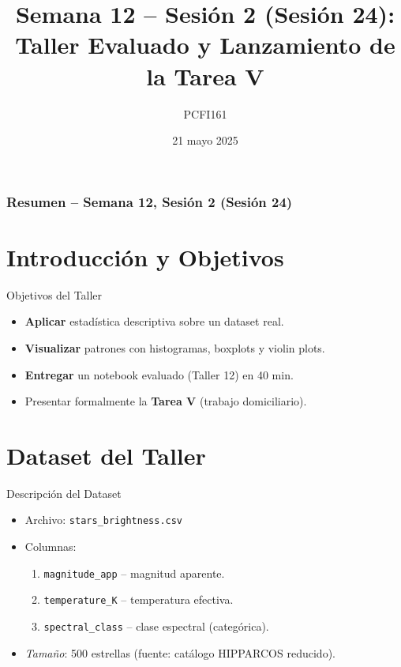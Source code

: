 \documentclass[10pt]{beamer}
\title{Semana 12 – Sesión 2 (Sesión 24): Taller Evaluado y Lanzamiento de la Tarea V}
\author{PCFI161}
\date{21 mayo 2025}
\begin{document}
\myfront{}
\begin{frame}
  \titlepage
\end{frame}

\begin{frame}
  \frametitle{Resumen – Semana 12, Sesión 2 (Sesión 24)}
  \tableofcontents
\end{frame}


\section{Introducción y Objetivos}
\begin{frame}{Objetivos del Taller}
  \begin{itemize}
    \item \textbf{Aplicar} estadística descriptiva sobre un dataset real.
    \item \textbf{Visualizar} patrones con histogramas, boxplots y violin plots.
    \item \textbf{Entregar} un notebook evaluado (\alert{Taller 12}) en 40 min.
    \item Presentar formalmente la \textbf{Tarea V} (trabajo domiciliario).
  \end{itemize}
\end{frame}

\section{Dataset del Taller}
\begin{frame}{Descripción del Dataset}
  \begin{itemize}
    \item Archivo: \texttt{stars\_brightness.csv}
    \item Columnas:
      \begin{enumerate}
        \item \texttt{magnitude\_app} – magnitud aparente.  
        \item \texttt{temperature\_K} – temperatura efectiva.
        \item \texttt{spectral\_class} – clase espectral (categórica).
      \end{enumerate}
    \item \emph{Tamaño}: 500 estrellas (fuente: catálogo HIPPARCOS reducido).
  \end{itemize}
\end{frame}
\end{document}

